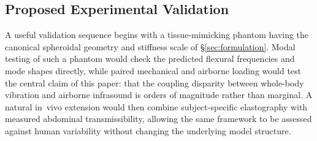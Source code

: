 \subsection{Proposed Experimental Validation}
\label{sec:disc:validation}

A useful validation sequence begins with a tissue-mimicking phantom having
the canonical spheroidal geometry and stiffness scale of
\S\ref{sec:formulation}.  Modal testing of such a phantom would check the
predicted flexural frequencies and mode shapes directly, while paired
mechanical and airborne loading would test the central claim of this paper:
that the coupling disparity between whole-body vibration and airborne
infrasound is orders of magnitude rather than marginal.  A natural in~vivo
extension would then combine subject-specific elastography with measured
abdominal transmissibility, allowing the same framework to be assessed
against human variability without changing the underlying model structure.
